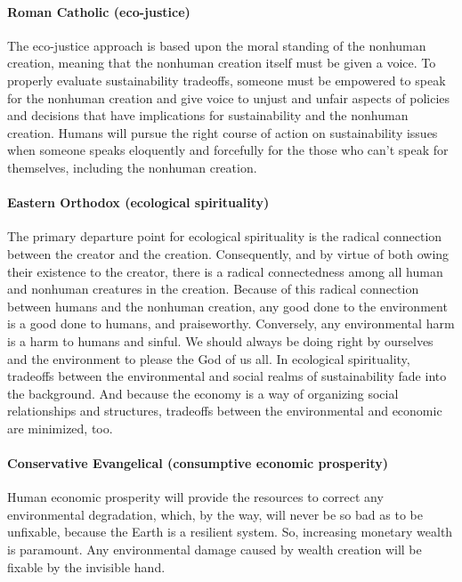 \documentclass[12pt]{article}
\begin{document}
\paragraph{Roman Catholic (eco-justice)} 

The eco-justice approach is based upon the moral standing of the nonhuman creation,
meaning that the nonhuman creation itself must be given a voice. 
To properly evaluate sustainability tradeoffs,
someone must be empowered to speak for the nonhuman creation and 
give voice to unjust and unfair aspects of policies and decisions
that have implications for sustainability and the nonhuman creation.
Humans will pursue the right course of action on sustainability issues
when someone speaks eloquently and forcefully for the 
those who can't speak for themselves, including the nonhuman creation. 

\paragraph{Eastern Orthodox (ecological spirituality)} 

The primary departure point for ecological spirituality is the radical connection between 
the creator and the creation.
Consequently, and by virtue of both owing their existence to the creator, 
there is a radical connectedness among all human and nonhuman creatures in the creation.
Because of this radical connection between humans and the nonhuman creation, 
any good done to the environment is a good done to humans, 
and praiseworthy. 
Conversely, any environmental harm is a harm to humans and sinful. 
We should always be doing right by ourselves and the environment 
to please the God of us all.
In ecological spirituality, 
tradeoffs between the environmental and social realms of sustainability
fade into the background.
And because the economy is a way of organizing social relationships and structures,
tradeoffs between the environmental and economic are minimized, too.

\paragraph{Conservative Evangelical (consumptive economic prosperity)} 

Human economic prosperity will provide the resources 
to correct any environmental degradation, which, 
by the way, will never be so bad as to be unfixable, 
because the Earth is a resilient system. 
So, increasing monetary wealth is paramount. 
Any environmental damage caused by wealth creation will be fixable by the invisible hand. 
\end{document}
